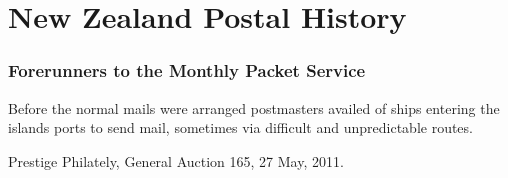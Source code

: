 \documentclass[justified]{tufte-book}
\begin{document}
\chapter{New Zealand Postal History}

\subsection{Forerunners to the Monthly Packet Service}

Before the normal mails were arranged postmasters availed of ships entering the islands ports to send mail, sometimes via difficult and unpredictable routes.
\long\def\addsale#1#2#3{%
  \expandafter\def\csname#1#2\endcsname{#3}
}

\addsale{Prestige}{165}{Prestige Philately, General Auction 165, 27 May, 2011.}

\long{}




\def\postmark#1{\texttt{#1}}

\def\NZindex#1{\protect\index{New Zealand!#1}#1}%
\gdef\ship#1{\protect\index{Ships!#1}\textit{#1\xspace}}
\def\people#1{\protect\index{Personalities!#1}#1\xspace}

\newcommand\printph[4][0.9]{%

\xdef\imagepath{\getstampfield{#2}{#3}{image}}%
\hskip210pt\hbox{\footnotesize #2-#3}\vskip1pt
\begin{fullwidth}
\texttt{[image: ./graphics/\\imagepath]}
\end{fullwidth}
\parindent=1em\small\getstampfield{#2}{#3}{description}
\getsale{Prestige}{165}\par
{\parindent=0pt\flushleft\small\getstampfield{#3}{#3}{ex}\endflushleft}\par


%
}

\newcommand\printside[4][0.9]{%

\xdef\imagepath{\getstampfield{#2}{#3}{image}}%
\hskip210pt\hbox{\footnotesize #2-#3}
\sidenote{\parindent=1em\small\getstampfield{#2}{#3}{description}}
\texttt{[image: ./graphics/\\imagepath]}
\vspace{0.7cm}
}
\end{document}
